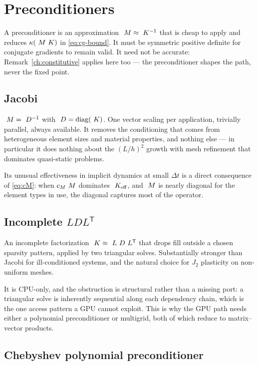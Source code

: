 \chapter{Preconditioners}
\label{ch:preconditioners}

A preconditioner is an approximation $~M \approx ~K^{-1}$ that is cheap
to apply and reduces $\kappa(~M~K)$ in \eqref{eq:cg-bound}.  It must be
symmetric positive definite for conjugate gradients to remain valid.  It need
not be accurate: Remark~\ref{ch:constitutive} applies here too --- the
preconditioner shapes the path, never the fixed point.

\section{Jacobi}

$~M = ~D^{-1}$ with $~D = \operatorname{diag}(~K)$.  One vector scaling per
application, trivially parallel, always available.  It removes the
conditioning that comes from heterogeneous element sizes and material
properties, and nothing else --- in particular it does nothing about the
$(L/h)^2$ growth with mesh refinement that dominates quasi-static problems.

Its unusual effectiveness in implicit dynamics at small $\Delta t$ is a direct
consequence of \eqref{eq:cM}: when $c_M~M$ dominates $~K_{\mathrm{eff}}$, and $~M$ is
nearly diagonal for the element types in use, the diagonal captures most of the
operator.

\section{Incomplete \texorpdfstring{$LDL^{\mathsf{T}}$}{LDLT}}

An incomplete factorization $~K \approx ~L~D~L^{\mathsf{T}}$
that drops fill outside a chosen sparsity pattern, applied by two triangular
solves.  Substantially stronger than Jacobi for ill-conditioned systems, and
the natural choice for $J_2$ plasticity on non-uniform meshes.

It is CPU-only, and the obstruction is structural rather than a missing port: a
triangular solve is inherently sequential along each dependency chain, which is
the one access pattern a GPU cannot exploit.  This is why the GPU path needs
either a polynomial preconditioner or multigrid, both of which reduce to
matrix--vector products.

\section{Chebyshev polynomial preconditioner}
\label{sec:chebyshev}

